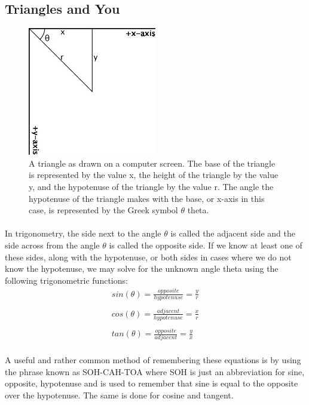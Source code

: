\documentclass[12pt, letterpaper]{report}
\begin{document}
		\subsection{Triangles and You}
		\begin{figure}[h]
		\centering
		\includegraphics[width=0.5\textwidth]{Processing Images/TrigTri/TrigTri.jpg}
		\caption{A triangle as drawn on a computer screen. The base of the triangle is represented by the value x, the height of the triangle by the value y, and the hypotenuse of the triangle by the value r. The angle the hypotenuse of the triangle makes with the base, or x-axis in this case, is represented by the Greek symbol $\theta$ theta.}
		\end{figure}\vspace{-\baselineskip}
		\paragraph{} In trigonometry, the side next to the angle $\theta$ is called the adjacent side and the side across from the angle $\theta$ is called the opposite side. If we know at least one of these sides, along with the hypotenuse, or both sides in cases where we do not know the hypotenuse, we may solve for the unknown angle theta using the following trigonometric functions:
		\begin{align*}
		sin\left(\theta\right) = \frac{opposite}{hypotenuse} = \frac{y}{r}
		\\\\
		cos\left(\theta\right) = \frac{adjacent}{hypotenuse} = \frac{x}{r}
		\\\\
		tan\left(\theta\right) = \frac{opposite}{adjacent} = \frac{y}{x}
		\end{align*}
		\paragraph{} A useful and rather common method of remembering these equations is by using the phrase known as SOH-CAH-TOA where SOH is just an abbreviation for sine, opposite, hypotenuse and is used to remember that sine is equal to the opposite over the hypotenuse. The same is done for cosine and tangent.
\end{document}
